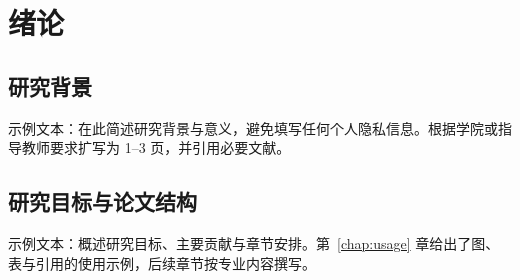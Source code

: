 \chapter{绪论}
\section{研究背景}
示例文本：在此简述研究背景与意义，避免填写任何个人隐私信息。根据学院或指导教师要求扩写为 1–3 页，并引用必要文献。

\section{研究目标与论文结构}
示例文本：概述研究目标、主要贡献与章节安排。第~\ref{chap:usage} 章给出了图、表与引用的使用示例，后续章节按专业内容撰写。
